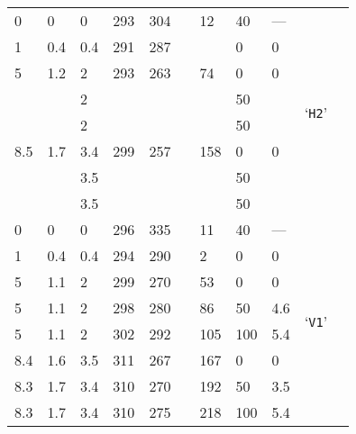 \begin{longtable}{llll llll lll}
	 \hdashline
	\num{0} & \num{0} &  \num{0} & \num{293} & \num{304} & \num{} & \num{12} & 40 & --- & \multirow{8}{*}{`\texttt{H2}'} \\*
	\num{1} & \num{.4} & \num{.4} & \num{291} & \num{287} & \num{} & \echaf{\num{-.9}} & \num{0} & \num{0} & \\*
	\num{5} & \num{1.2} & \num{2} & \num{293} & \num{263} & \num{} & \num{74} & \num{0} & \num{0} & \\*
	\num{} & \num{} &  \num{2} & \num{} & \num{} & \num{} & \num{} & \num{50} & \num{} & \\*
	\num{} & \num{} &  \num{2} & \num{} & \num{} & \num{} & \num{} & \num{50} & \num{} & \\*
	\num{8.5} & \num{1.7} & \num{3.4} & \num{299} & \num{257} & \num{} & \num{158} & \num{0} & \num{0} & \\*
	\num{} & \num{} &  \num{3.5} & \num{} & \num{} & \num{} & \num{} & \num{50} & \num{} & \\*
	\num{} & \num{} &  \num{3.5} & \num{} & \num{} & \num{} & \num{} & \num{50} & \num{} & \\
	
	 \hdashline
	\num{0} & \num{0} & \num{0} & \num{296} & \num{335} & \num{} & \num{11} & \num{40} & --- & \multirow{8}{*}{`\texttt{V1}'} \\*
	\num{1} & \num{.4} & \num{.4} & \num{294} & \num{290} & \num{} & \num{2} & \num{0} & \num{0} & \\*
	\num{5} & \num{1.1} & \num{2} & \num{299} & \num{270} & \num{} & \num{53} & \num{0} & \num{0} & \\*
	\num{5} & \num{1.1} & \num{2} & \num{298} & \num{280} & \num{} & \num{86} & \num{50} & \num{4.6} & \\*
	\num{5} & \num{1.1} & \num{2} & \num{302} & \num{292} & \num{} & \num{105} & \num{100} & \num{5.4} & \\*
	\num{8.4} & \num{1.6} & \num{3.5} & \num{311} & \num{267} & \num{} & \num{167} & \num{0} & \num{0} & \\*
	\num{8.3} & \num{1.7} & \num{3.4} & \num{310} & \num{270} & \num{} & \num{192} & \num{50} & \num{3.5} & \\*
	\num{8.3} & \num{1.7} & \num{3.4} & \num{310} & \num{275} & \num{} & \num{218} & \num{100} & \num{5.4} & \\
	

\end{longtable}
